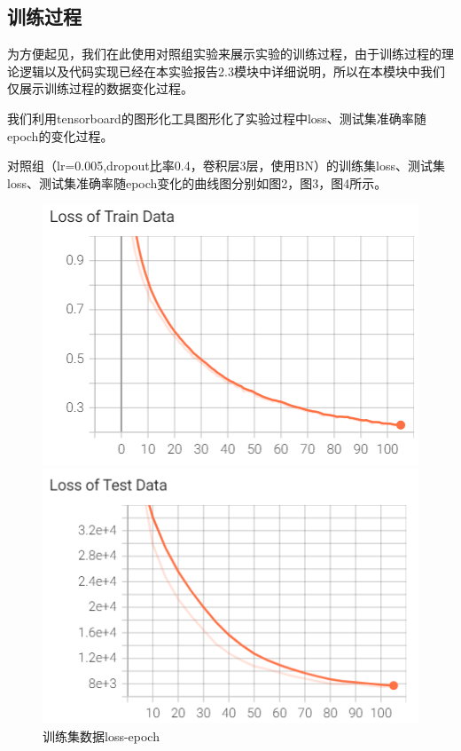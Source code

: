 \documentclass[11pt]{article}
\begin{document}
\subsection{训练过程}
为方便起见，我们在此使用对照组实验来展示实验的训练过程，由于训练过程的理论逻辑以及代码实现已经在本实验报告2.3模块中详细说明，所以在本模块中我们仅展示训练过程的数据变化过程。\par
我们利用tensorboard的图形化工具图形化了实验过程中loss、测试集准确率随epoch的变化过程。\par
对照组（lr=0.005,dropout比率0.4，卷积层3层，使用BN）的训练集loss、测试集loss、测试集准确率随epoch变化的曲线图分别如图2，图3，图4所示。\par
\begin{figure}[h]
\centering
\begin{minipage}[t]{0.3\textwidth} 
\centering
\includegraphics[scale=0.6]{images/train_loss.png}
\caption{训练集数据loss-epoch}
\end{minipage}
\begin{minipage}[t]{0.3\textwidth}%
\centering
\includegraphics[scale=0.6]{images/test_loss.png}

\end{minipage}
\end{figure}
\end{document}
